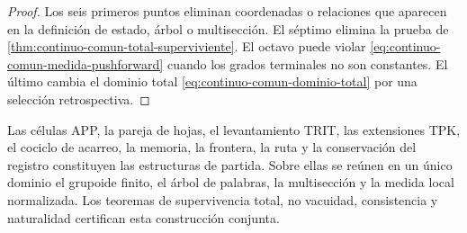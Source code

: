 \begin{proof}
Los seis primeros puntos eliminan coordenadas o relaciones que aparecen en la
definición de estado, árbol o multisección.  El séptimo elimina la prueba de
\cref{thm:continuo-comun-total-superviviente}.  El octavo puede violar
\eqref{eq:continuo-comun-medida-pushforward} cuando los grados terminales no
son constantes.  El último cambia el dominio total
\eqref{eq:continuo-comun-dominio-total} por una selección retrospectiva.
\end{proof}

Las células APP, la pareja de hojas, el levantamiento TRIT, las extensiones
TPK, el cociclo de acarreo, la memoria, la frontera, la ruta y la conservación
del registro constituyen las estructuras de partida. Sobre ellas se reúnen en
un único dominio el grupoide finito, el árbol de palabras, la multisección y
la medida local normalizada. Los teoremas de supervivencia total, no vacuidad,
consistencia y naturalidad certifican esta construcción conjunta.
